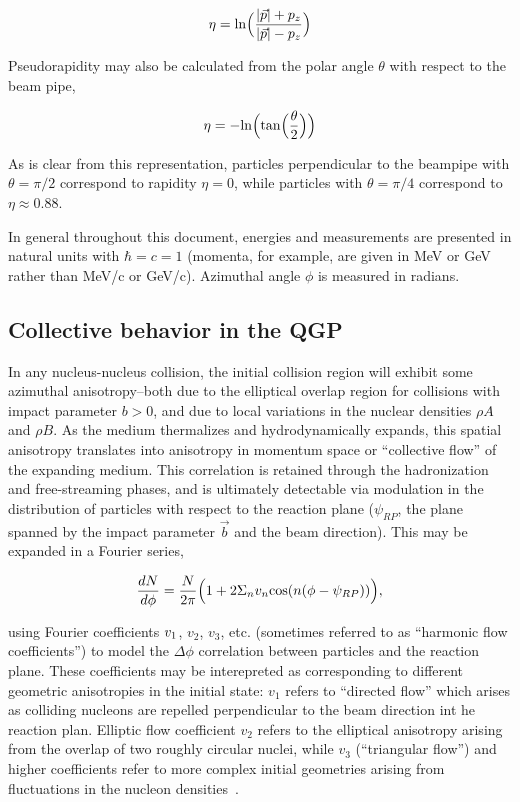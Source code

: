 \begin{equation}
\label{eq:eta}
\eta = {\rm ln} \Big(\frac{|\vec{p}|+p_{z}}{|\vec{p}|-p_{z}}\Big)
\end{equation}

\noindent Pseudorapidity may also be calculated from the polar angle $\theta$ with respect to the beam pipe,

\begin{equation}
\label{eq:eta2}
\eta = \rm{-ln\Big(tan\Big(\frac{\theta}{2}\Big)\Big)}
\end{equation}

\noindent As is clear from this representation, particles perpendicular to the beampipe with $\theta = \pi/2$ correspond to rapidity $\eta = 0$, while particles with $\theta = \pi/4$ correspond to $\eta \approx 0.88$.  

In general throughout this document, energies and measurements are presented in natural units with $\hbar = c = 1$ (momenta, for example, are given in MeV or GeV rather than MeV/c or GeV/c).  Azimuthal angle $\phi$ is measured in radians.  

\subsection{Collective behavior in the QGP}
\label{sec:theory_collectivity}

In any nucleus-nucleus collision, the initial collision region will exhibit some azimuthal anisotropy--both due to the elliptical overlap region for collisions with impact parameter $b > 0$, and due to local variations in the nuclear densities $\rho{A}$ and $\rho{B}$.  As the medium thermalizes and hydrodynamically expands, this spatial anisotropy translates into anisotropy in momentum space or ``collective flow'' of the expanding medium.  This correlation is retained through the hadronization and free-streaming phases, and is ultimately detectable via modulation in the distribution of particles with respect to the reaction plane ($\psi_{RP}$, the plane spanned by the impact parameter $\vec{b}$ and the beam direction).  This may be expanded in a Fourier series, 

\begin{equation}
\label{eq:collective_flow_rp}
\frac{dN}{d\phi} = \frac{N}{2\pi} \Big(1+2\Sigma_{n} v_{n} {\rm cos}(n(\phi - \psi_{RP}))\Big),
\end{equation}

\noindent using Fourier coefficients $v_{\rm 1}$, $v_{2}$, $v_{3}$, etc. (sometimes referred to as ``harmonic flow coefficients'') to model the $\Delta\phi$ correlation between particles and the reaction plane.  These coefficients may be interepreted as corresponding to different geometric anisotropies in the initial state:  $v_{1}$ refers to  ``directed flow'' which arises as colliding nucleons are repelled perpendicular to the beam direction int he reaction plan.  Elliptic flow coefficient $v_{2}$ refers to the elliptical anisotropy arising from the overlap of two roughly circular nuclei, while $v_{3}$ (``triangular flow'') and higher coefficients refer to more complex initial geometries arising from fluctuations in the nucleon densities~\cite{Voloshin:2008dg}.

